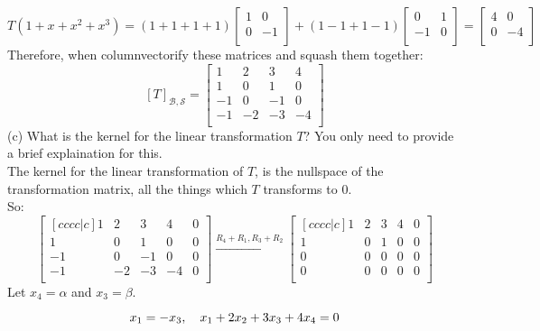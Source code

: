 \documentclass[12pt]{article}
\begin{document}
$$
T(1+x+x^2+x^3)=
(1+1+1+1)
\begin{bmatrix}
	1 & 0 \\
	0 & -1 \\
\end{bmatrix}
+(1-1+1-1)
\begin{bmatrix}
	0 & 1 \\
	-1 & 0 \\
\end{bmatrix}
=
\begin{bmatrix}
	4 & 0 \\
	0 & -4 \\
\end{bmatrix}
$$
Therefore, when columnvectorify these matrices and squash them together:
$$
\left[
T
\right]_{\mathcal{B},\mathcal{S}}
=
\begin{bmatrix}
	1 & 2 & 3 & 4 \\
	1 & 0 & 1 & 0 \\
	-1 & 0 & -1 & 0 \\
	-1 & -2 & -3 & -4 \\
\end{bmatrix}
$$
\medskip
(c) What is the kernel for the linear transformation $T$? You only need to provide a brief explaination for this.\\
\medskip
The kernel for the linear transformation of $T$, is the nullspace of the transformation matrix, all the things which $T$ transforms to $0$.\\
So:
$$
\begin{bmatrix}[cccc|c]
	1 & 2 & 3 & 4 & 0\\
	1 & 0 & 1 & 0 & 0\\
	-1 & 0 & -1 & 0 & 0\\
	-1 & -2 & -3 & -4 & 0\\
\end{bmatrix}
\overset{R_4+R_1,R_3+R_2}{\longrightarrow}
\begin{bmatrix}[cccc|c]
	1 & 2 & 3 & 4 & 0\\
	1 & 0 & 1 & 0 & 0\\
	0 & 0 & 0 & 0 & 0\\
	0 & 0 & 0 & 0 & 0\\
\end{bmatrix} 
$$
Let $x_4=\alpha$ and $x_3=\beta$.

$$
x_1=-x_3,\hspace{10px} x_1+2x_2+3x_3+4x_4=0
$$
\end{document}
